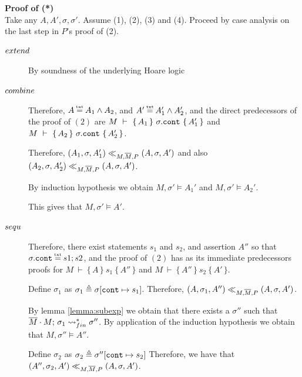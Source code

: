 \vspace{.1cm}
\noindent
\textbf{Proof of (*)}\\
Take any $A, A', \sigma, \sigma'$. Assume  (1), (2), (3) and (4).
Proceed by case analysis on the last step in $P$'s proof of (2).


\begin{description} 

\item[${\sc{extend}}$] 

By soundness of the underlying Hoare logic

\item[${\sc{combine}}$] 

Therefore, $A \txteq A_1 \wedge A_2$,  and $A' \txteq A_1' \wedge A_2'$, and the direct predecessors of the proof of $(2)$
are $M\ \vdash\  \{\, A_1 \,  \}\ \sigma.\prg{cont}\  \{\, A_1' \, \}$ and $M\ \vdash\  \{\, A_2 \,  \}\ \sigma.\prg{cont}\  \{\, A_2' \, \}$. 

Therefore, $(A_1,\sigma,A_1') \ll_{M,\overline{M},P} (A,\sigma,A')$ and also $(A_2,\sigma,A_2') \ll_{M,\overline{M},P} (A,\sigma,A')$. 

By  induction hypothesis we obtain   
$M, \sigma' \models A_1'$ and $M, \sigma' \models A_2'$.

This gives that $M, \sigma' \models A'$.


\item[${\sc{sequ}}$] 

Therefore, there exist statements $s_1$ and $s_2$, and assertion  $A''$ so that $\sigma.\prg{cont}\txteq  s1; s2$, and
the proof of  $(2)$ %
has as its immediate predecessors proofs for 
$M\ \vdash\  \{\, A \,  \}\ s_1\  \{\, A'' \, \}$ and $M\ \vdash\  \{\, A'' \,  \}\  s_2\  \{\, A' \, \}$.

Define $\sigma_1$ as  $\sigma_1 \triangleq \sigma[\mbox{\normalfont{\texttt{cont}}} \mapsto s_1]$.
Therefore,  $(A,\sigma_1,A'') \ll_{M,\overline{M},P} (A,\sigma,A')$. 

By lemma \ref{lemma:subexp} we obtain that there exists a $\sigma''$ such that $\overline{M}\cdot M;\, {\sigma_1} \rightsquigarrow^*_{fin} \sigma''$. 
 By application of the induction hypothesis we obtain that $M, \sigma'' \models A''$.
 
 Define $\sigma_2$ as  $\sigma_2 \triangleq \sigma''[\mbox{\normalfont{\texttt{cont}}} \mapsto s_2]$
Therefore, we have that $(A'',\sigma_2,A') \ll_{M,\overline{M},P} (A,\sigma,A')$. 


\end{description}
